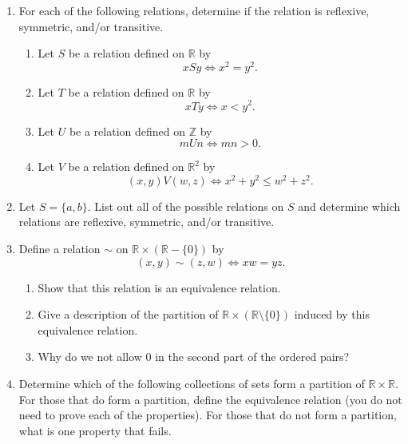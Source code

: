 \documentclass[
]{book}
\providecommand{\tightlist}{%
  \setlength{\itemsep}{0pt}\setlength{\parskip}{0pt}}
\theoremstyle{definition}
\theoremstyle{definition}
\theoremstyle{definition}
\theoremstyle{definition}
\theoremstyle{remark}
\begin{document}
\begin{enumerate}
\def\labelenumi{\arabic{enumi}.}
\item
  For each of the following relations, determine if the relation is reflexive, symmetric, and/or transitive.

  \begin{enumerate}
  \def\labelenumii{\alph{enumii}.}
  \tightlist
  \item
    Let \(S\) be a relation defined on \(\mathbb{R}\) by \[xSy \Leftrightarrow x^2=y^2.\]
  \item
    Let \(T\) be a relation defined on \(\mathbb{R}\) by \[xTy \Leftrightarrow x<y^2.\]
  \item
    Let \(U\) be a relation defined on \(\mathbb{Z}\) by \[mUn \Leftrightarrow mn>0.\]
  \item
    Let \(V\) be a relation defined on \(\mathbb{R}^2\) by \[ (x,y)V(w,z) \Leftrightarrow x^2+y^2 \leq w^2+z^2.\]
  \end{enumerate}
\item
  Let \(S=\{a,b\}\). List out all of the possible relations on \(S\) and determine which relations are reflexive, symmetric, and/or transitive.
\item
  Define a relation \(\sim\) on \(\mathbb{R}\times (\mathbb{R}-\{0\})\) by
  \[(x,y) \sim (z,w) \Leftrightarrow xw=yz.\]

  \begin{enumerate}
  \def\labelenumii{\alph{enumii}.}
  \tightlist
  \item
    Show that this relation is an equivalence relation.
  \item
    Give a description of the partition of \(\mathbb{R}\times (\mathbb{R}\setminus \{0\})\) induced by this equivalence relation.
  \item
    Why do we not allow \(0\) in the second part of the ordered pairs?
  \end{enumerate}
\item
  Determine which of the following collections of sets form a partition of \(\mathbb{R}\times \mathbb{R}\). For those that do form a partition, define the equivalence relation (you do not need to prove each of the properties). For those that do not form a partition, what is one property that fails.


\end{enumerate}
\end{document}
